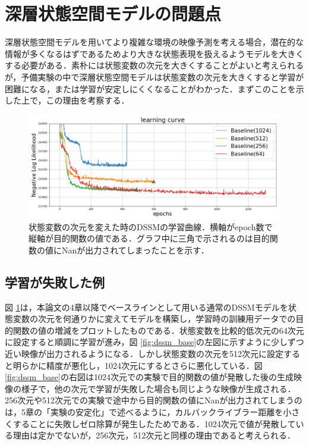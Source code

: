 \documentclass[10pt, twocolumn]{jarticle}
\begin{document}
\section{深層状態空間モデルの問題点}
深層状態空間モデルを用いてより複雑な環境の映像予測を考える場合，潜在的な情報が多くなるはずであるためより大きな状態表現を扱えるようモデルを大きくする必要がある．素朴には状態変数の次元を大きくすることがよいと考えられるが，予備実験の中で深層状態空間モデルは状態変数の次元を大きくすると学習が困難になる，または学習が安定しにくくなることがわかった．まずこのことを示した上で，この理由を考察する．

\begin{figure}[bp]
  \begin{center}
    \includegraphics[width=\linewidth]{./figures/dssm_curve_yoko.png}
    \caption[状態変数の次元を変えた時のDSSMの学習曲線]{状態変数の次元を変えた時のDSSMの学習曲線．横軸がepoch数で縦軸が目的関数の値である．グラフ中に三角で示されるのは目的関数の値にNanが出力されてしまったことを示す．}
    \label{fig:dssm_curve}
  \end{center}
\end{figure}

\subsection{学習が失敗した例}
図 \ref{fig:dssm_curve}は，本論文の4章以降でベースラインとして用いる通常のDSSMモデルを状態変数の次元を何通りかに変えてモデルを構築し，学習時の訓練用データでの目的関数の値の増減をプロットしたものである．状態変数を比較的低次元の64次元に設定すると順調に学習が進み，図 \ref{fig:dssm_base}の左図に示すように少しずつ近い映像が出力されるようになる．しかし状態変数の次元を512次元に設定すると明らかに精度が悪化し，1024次元にするとさらに悪化している．図 \ref{fig:dssm_base}の右図は1024次元での実験で目的関数の値が発散した後の生成映像の様子で，他の次元で学習が失敗した場合も同じような映像が生成される．256次元や512次元での実験で途中から目的関数の値にNanが出力されてしまうのは，5章の「実験の安定化」で述べるように，カルバックライブラー距離を小さくすることに失敗しゼロ除算が発生したためである．1024次元で値が発散している理由は定かでないが，256次元，512次元と同様の理由であると考えられる．
\end{document}
